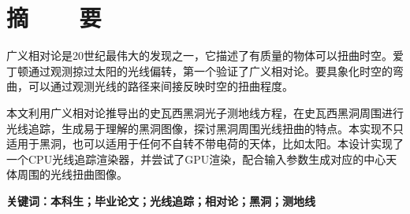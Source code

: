 %
%
%
%
%

\topskip=0pt

\vspace*{-7mm}

\begin{center}
  \heiti{}\textbf{\thesisTitle}
\end{center}

\vspace*{2mm}

{\let\clearpage\relax \chapter*{\textmd{摘~~~~要}}}
\setcounter{page}{1}

\vspace*{1mm}

\setlength{\parskip}{0em}

广义相对论是20世纪最伟大的发现之一，它描述了有质量的物体可以扭曲时空。爱丁顿通过观测掠过太阳的光线偏转，第一个验证了广义相对论。要具象化时空的弯曲，可以通过观测光线的路径来间接反映时空的扭曲程度。

本文利用广义相对论推导出的史瓦西黑洞光子测地线方程，在史瓦西黑洞周围进行光线追踪，生成易于理解的黑洞图像，探讨黑洞周围光线扭曲的特点。本实现不只适用于黑洞，也可以适用于任何不自转不带电荷的天体，比如太阳。本设计实现了一个CPU光线追踪渲染器，并尝试了GPU渲染，配合输入参数生成对应的中心天体周围的光线扭曲图像。

\vspace{4ex}\noindent\textbf{\heiti 关键词：本科生；毕业论文；光线追踪；相对论；黑洞；测地线}
\newpage

\topskip=0pt

\vspace*{2mm}

\begin{spacing}{0.95}
  \centering
  \heiti{}\textbf{\thesisTitleEN}
\end{spacing}

